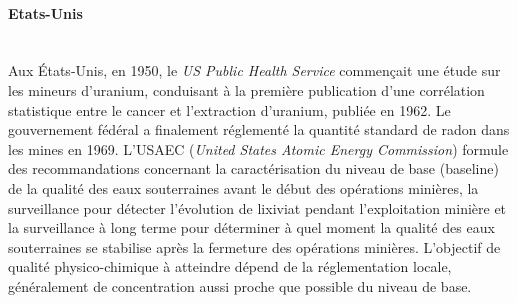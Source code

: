 \documentclass{article}
\begin{document}

\paragraph{Etats-Unis \\ \\}

Aux États-Unis, en 1950, le \textit{US Public Health Service} commençait une étude sur les mineurs d'uranium, conduisant à la première publication d'une corrélation statistique entre le cancer et l'extraction d'uranium, publiée en 1962. Le gouvernement fédéral a finalement réglementé la quantité standard de radon dans les mines en 1969.%
L'USAEC (\textit{United States Atomic Energy Commission}) formule des recommandations concernant la caractérisation du niveau de base (baseline) de la qualité des eaux souterraines avant le début des opérations minières, la surveillance pour détecter l’évolution de lixiviat pendant l'exploitation minière et la surveillance à long terme pour déterminer à quel moment la qualité des eaux souterraines se stabilise après la fermeture des opérations minières.
L'objectif de qualité physico-chimique à atteindre dépend de la réglementation locale, généralement de concentration aussi proche que possible du niveau de base.
\end{document}
